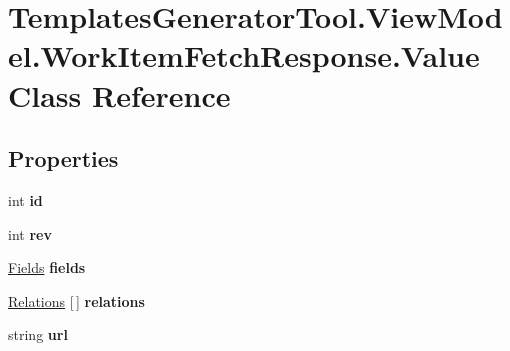 \hypertarget{class_templates_generator_tool_1_1_view_model_1_1_work_item_fetch_response_1_1_value}{}\section{Templates\+Generator\+Tool.\+View\+Model.\+Work\+Item\+Fetch\+Response.\+Value Class Reference}
\label{class_templates_generator_tool_1_1_view_model_1_1_work_item_fetch_response_1_1_value}
\subsection*{Properties}
\begin{DoxyCompactItemize}
\item 
\mbox{\label{class_templates_generator_tool_1_1_view_model_1_1_work_item_fetch_response_1_1_value_ab498c33bc993e4293b9d59efa097329b}} 
int {\bfseries id}
\item 
\mbox{\label{class_templates_generator_tool_1_1_view_model_1_1_work_item_fetch_response_1_1_value_ad0c9eff1b121ac7f2d8b6800b89572b7}} 
int {\bfseries rev}
\item 
\mbox{\label{class_templates_generator_tool_1_1_view_model_1_1_work_item_fetch_response_1_1_value_aa88e0e20098cdbcc3821f8da1b377282}} 
\mbox{\hyperlink{class_templates_generator_tool_1_1_view_model_1_1_work_item_fetch_response_1_1_fields}{Fields}} {\bfseries fields}
\item 
\mbox{\label{class_templates_generator_tool_1_1_view_model_1_1_work_item_fetch_response_1_1_value_ae7f7685b4af50a7a744768dd9b8b7820}} 
\mbox{\hyperlink{class_templates_generator_tool_1_1_view_model_1_1_work_item_fetch_response_1_1_relations}{Relations}} \mbox{[}$\,$\mbox{]} {\bfseries relations}
\item 
\mbox{\label{class_templates_generator_tool_1_1_view_model_1_1_work_item_fetch_response_1_1_value_abb85efbd3086d5add5c7101d2235d46a}} 
string {\bfseries url}
\end{DoxyCompactItemize}


